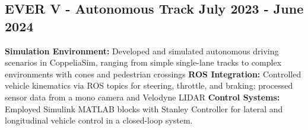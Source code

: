 \subsection*{
  EVER V - Autonomous Track
  \hspace*{\fill}
  \dateformat July 2023 - June 2024
}
\begin{tasks}
  \task \textbf{Simulation Environment:} Developed and simulated autonomous driving scenarios in CoppeliaSim, ranging from simple single-lane tracks to complex environments with cones and pedestrian crossings
  \task \textbf{ROS Integration:} Controlled vehicle kinematics via ROS topics for steering, throttle, and braking; processed sensor data from a mono camera and Velodyne LIDAR
  \task \textbf{Control Systems:} Employed Simulink MATLAB blocks with Stanley Controller for lateral and longitudinal vehicle control in a closed-loop system.
\end{tasks}
%
%
%
%
%
%
%
%
%
%
